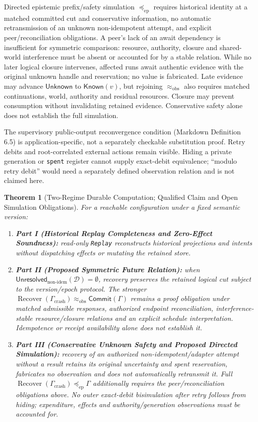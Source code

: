 \documentclass[11pt,a4paper]{article}
\newtheorem{theorem}{Theorem}[section]
\theoremstyle{definition}
\theoremstyle{remark}
\begin{document}
Directed epistemic prefix/safety simulation $\preccurlyeq_{\mathrm{ep}}$ requires historical identity at a matched committed cut and conservative information, no automatic retransmission of an unknown non-idempotent attempt, and explicit peer/reconciliation obligations. A peer's lack of an await dependency is insufficient for symmetric comparison: resource, authority, closure and shared-world interference must be absent or accounted for by a stable relation. While no later logical closure intervenes, affected runs await authentic evidence with the original unknown handle and reservation; no value is fabricated. Late evidence may advance $\mathsf{Unknown}$ to $\mathsf{Known}(v)$, but rejoining $\approx_{\mathrm{obs}}$ also requires matched continuations, world, authority and residual resources. Closure may prevent consumption without invalidating retained evidence. Conservative safety alone does not establish the full simulation.

The supervisory public-output reconvergence condition (Markdown Definition 6.5) is application-specific, not a separately checkable substitution proof. Retry debits and root-correlated external actions remain visible. Hiding a private generation or \texttt{spent} register cannot supply exact-debit equivalence; ``modulo retry debit'' would need a separately defined observation relation and is not claimed here.

\begin{theorem}[Two-Regime Durable Computation; Qualified Claim and Open Simulation Obligations]
\label{thm:fundamental}
For a reachable configuration under a fixed semantic version:
\begin{enumerate}
\item \textbf{Part I (Historical Replay Completeness and Zero-Effect Soundness):} read-only \texttt{Replay} reconstructs historical projections and intents without dispatching effects or mutating the retained store.
\item \textbf{Part II (Proposed Symmetric Future Relation):} when $\mathsf{Unresolved}_{\text{non-idem}}(\mathcal{D})=\emptyset$, recovery preserves the retained logical cut subject to the version/epoch protocol. The stronger $\operatorname{Recover}(\Gamma_{\text{crash}})\approx_{\mathrm{obs}}\mathsf{Commit}(\Gamma)$ remains a proof obligation under matched admissible responses, authorized endpoint reconciliation, interference-stable resource/closure relations and an explicit schedule interpretation. Idempotence or receipt availability alone does not establish it.
\item \textbf{Part III (Conservative Unknown Safety and Proposed Directed Simulation):} recovery of an authorized non-idempotent/adapter attempt without a result retains its original uncertainty and spent reservation, fabricates no observation and does not automatically retransmit it. Full $\operatorname{Recover}(\Gamma_{\text{crash}})\preccurlyeq_{\mathrm{ep}}\Gamma$ additionally requires the peer/reconciliation obligations above. No outer exact-debit bisimulation after retry follows from hiding; expenditure, effects and authority/generation observations must be accounted for.
\end{enumerate}
\end{theorem}
\end{document}

